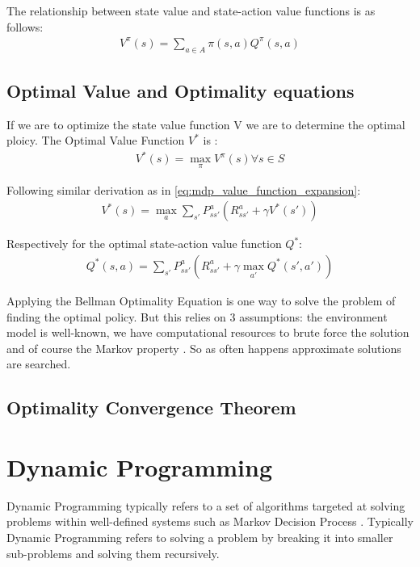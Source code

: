 The relationship between state value and state-action value functions is as follows:
\begin{align}
    V^{\pi}(s) = \sum_{a \in A} \pi(s, a) Q^{\pi}(s, a) 
\end{align}

\subsection{Optimal Value and Optimality equations}
If we are to optimize the state value function V we are to determine the optimal ploicy. The Optimal Value Function $V^{*}$ is \cite{lecture_mdp}:
\begin{align}
    V^*(s) = \max_{\pi} V^{\pi}(s)   \forall s \in S
\end{align}

Following similar derivation as in \ref{eq:mdp_value_function_expansion}:
\begin{align}
    V^*(s) = \max_{a}\sum_{s'} P^{a}_{ss'} (R^{a}_{ss'} + \gamma V^{*}(s'))
\end{align}

Respectively for the optimal state-action value function $Q^{*}$:
\begin{align}
    Q^*(s, a) = \sum_{s'} P^{a}_{ss'} (R^{a}_{ss'} + \gamma \max_{a'}Q^{*}(s', a'))
\end{align}

Applying the Bellman Optimality Equation is one way to solve the problem of finding the optimal policy. But this relies on 3 assumptions: the environment model is well-known, we have computational resources to brute force the solution and of course the Markov property \cite{lecture_mdp}. So as often happens approximate solutions are searched.

\subsection{Optimality Convergence Theorem}

\section{Dynamic Programming}
Dynamic Programming typically refers to a set of algorithms targeted at solving problems within well-defined systems such as Markov Decision Process \cite{lecture_dp}. Typically Dynamic Programming refers to solving a problem by breaking it into smaller sub-problems and solving them recursively.

